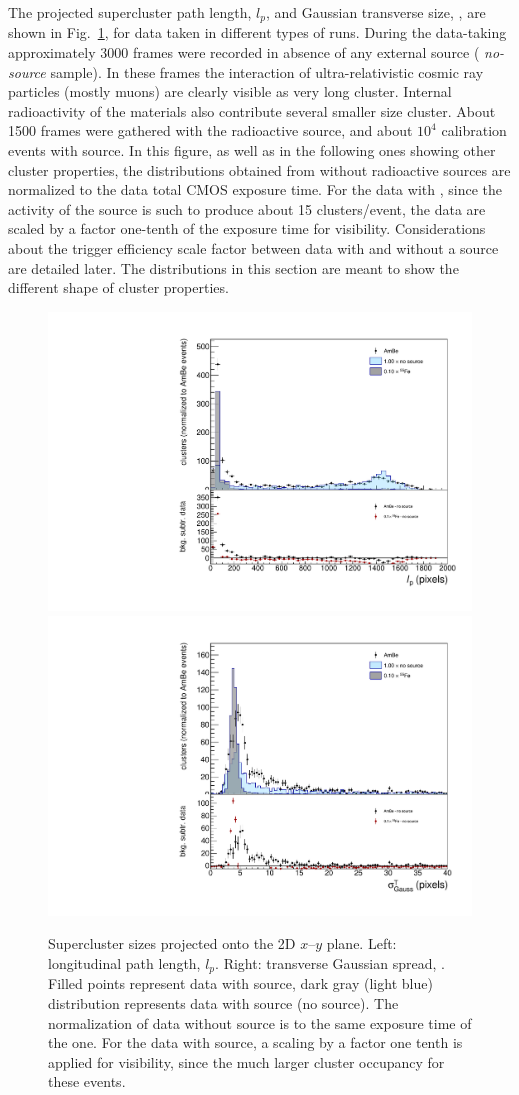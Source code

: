 The projected supercluster path length, $l_p$, and Gaussian transverse
size, \tsigmag, are shown in Fig.~\ref{fig:clsize}, for data taken in
different types of runs.  During the data-taking approximately 3000
frames were recorded in absence of any external source ({\it
no-source} sample). In these frames the interaction of
ultra-relativistic cosmic ray particles (mostly muons) are clearly
visible as very long cluster. Internal radioactivity of the \lemon
materials also contribute several smaller size cluster. About 1500
frames were gathered with the \ambe radioactive source, and about
$10^4$ calibration events with \fe source. In this figure, as well as
in the following ones showing other cluster properties, the
distributions obtained from without radioactive sources are normalized
to the \ambe data total CMOS exposure time. For the data with \fe,
since the activity of the source is such to produce about 15
clusters/event, the data are scaled by a factor one-tenth of the \ambe
exposure time for visibility. Considerations about the trigger
efficiency scale factor between data with and without a source are
detailed later. The distributions in this section are meant to show
the different shape of cluster properties.

\begin{figure}[ht]
  \begin{center}
  \includegraphics[width=0.45\linewidth]{figures/length}
  \includegraphics[width=0.45\linewidth]{figures/tgausssigma}

  \caption{Supercluster sizes projected onto the 2D $x$--$y$
    plane. Left: longitudinal path length, $l_p$.  Right: transverse
    Gaussian spread, \tsigmag. Filled points represent data with \ambe
    source, dark gray (light blue) distribution represents data
    with \fe source (no source).  The normalization of data without
    source is to the same exposure time of the \ambe one. For the data
    with \fe source, a scaling by a factor one tenth is applied for
    visibility, since the much larger cluster occupancy for these
    events.  \label{fig:clsize}} \end{center}
\end{figure}

